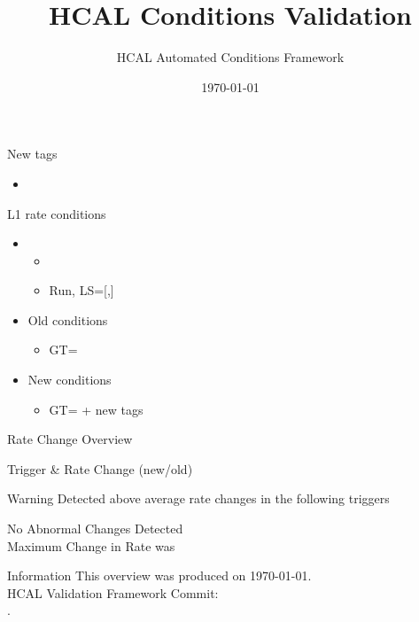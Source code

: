 \documentclass{beamer}
\title{HCAL Conditions Validation}
\author{HCAL Automated Conditions Framework}
\institute{CERN}
\date{\today}
\begin{document}
\frame{\titlepage}



\begin{frame}{New tags}
    \begin{itemize}
        \item {}
    \end{itemize}
\end{frame}


\begin{frame}{L1 rate conditions}
    \begin{itemize}
        \item {}
            \begin{itemize}
                \item {}
                \item Run, LS=[,]
            \end{itemize}
    \end{itemize}

    \begin{itemize}
        \item Old conditions
            \begin{itemize}
                \item GT=
            \end{itemize}
        \item New conditions
            \begin{itemize}
                \item GT= +  new tags
            \end{itemize}
     \end{itemize}
\end{frame}


\begin{frame}{Rate Change Overview}

\begin{center}
        Trigger & Rate Change (new/old) \\ \hline
          

    \begin{alertblock}{Warning}
        \large Detected above average rate changes in the following triggers\\
         
    \end{alertblock}
    \centering
    \Large No Abnormal Changes Detected \\
    Maximum Change in Rate was 
\end{center}

\end{frame}



\begin{frame}{Information}
    This overview was produced on \today.\\
    HCAL Validation Framework Commit: \\
    .
\end{frame}
\end{document}
